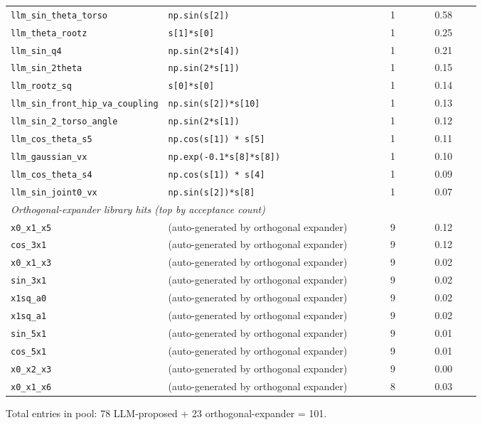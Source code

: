\documentclass{article}
\theoremstyle{definition}
\begin{document}
\begin{table}[h]
\begin{tabular}{p{0.32\linewidth}p{0.45\linewidth}cc}
\texttt{llm\_sin\_theta\_torso} & \texttt{np.sin(s[2])} & 1 & 0.58 \\
\texttt{llm\_theta\_rootz} & \texttt{s[1]*s[0]} & 1 & 0.25 \\
\texttt{llm\_sin\_q4} & \texttt{np.sin(2*s[4])} & 1 & 0.21 \\
\texttt{llm\_sin\_2theta} & \texttt{np.sin(2*s[1])} & 1 & 0.15 \\
\texttt{llm\_rootz\_sq} & \texttt{s[0]*s[0]} & 1 & 0.14 \\
\texttt{llm\_sin\_front\_hip\_va\_coupling} & \texttt{np.sin(s[2])*s[10]} & 1 & 0.13 \\
\texttt{llm\_sin\_2\_torso\_angle} & \texttt{np.sin(2*s[1])} & 1 & 0.12 \\
\texttt{llm\_cos\_theta\_s5} & \texttt{np.cos(s[1]) * s[5]} & 1 & 0.11 \\
\texttt{llm\_gaussian\_vx} & \texttt{np.exp(-0.1*s[8]*s[8])} & 1 & 0.10 \\
\texttt{llm\_cos\_theta\_s4} & \texttt{np.cos(s[1]) * s[4]} & 1 & 0.09 \\
\texttt{llm\_sin\_joint0\_vx} & \texttt{np.sin(s[2])*s[8]} & 1 & 0.07 \\
\midrule
\multicolumn{4}{l}{\emph{Orthogonal-expander library hits (top by acceptance count)}} \\
\texttt{x0\_x1\_x5} & (auto-generated by orthogonal expander) & 9 & 0.12 \\
\texttt{cos\_3x1} & (auto-generated by orthogonal expander) & 9 & 0.12 \\
\texttt{x0\_x1\_x3} & (auto-generated by orthogonal expander) & 9 & 0.02 \\
\texttt{sin\_3x1} & (auto-generated by orthogonal expander) & 9 & 0.02 \\
\texttt{x1sq\_a0} & (auto-generated by orthogonal expander) & 9 & 0.02 \\
\texttt{x1sq\_a1} & (auto-generated by orthogonal expander) & 9 & 0.02 \\
\texttt{sin\_5x1} & (auto-generated by orthogonal expander) & 9 & 0.01 \\
\texttt{cos\_5x1} & (auto-generated by orthogonal expander) & 9 & 0.01 \\
\texttt{x0\_x2\_x3} & (auto-generated by orthogonal expander) & 9 & 0.00 \\
\texttt{x0\_x1\_x6} & (auto-generated by orthogonal expander) & 8 & 0.03 \\
\bottomrule
\end{tabular}
\par\smallskip\footnotesize
Total entries in pool: 78 LLM-proposed + 23 orthogonal-expander = 101.
\end{table}
\end{document}
